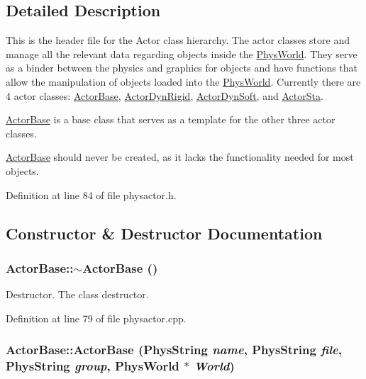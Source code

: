 \subsection{Detailed Description}
This is the header file for the Actor class hierarchy. The actor classes store and manage all the relevant data regarding objects inside the \hyperlink{classPhysWorld}{PhysWorld}. They serve as a binder between the physics and graphics for objects and have functions that allow the manipulation of objects loaded into the \hyperlink{classPhysWorld}{PhysWorld}. Currently there are 4 actor classes: \hyperlink{classActorBase}{ActorBase}, \hyperlink{classActorDynRigid}{ActorDynRigid}, \hyperlink{classActorDynSoft}{ActorDynSoft}, and \hyperlink{classActorSta}{ActorSta}. \par
 \hyperlink{classActorBase}{ActorBase} is a base class that serves as a template for the other three actor classes. \par
 \hyperlink{classActorBase}{ActorBase} should never be created, as it lacks the functionality needed for most objects. 

Definition at line 84 of file physactor.h.

\subsection{Constructor \& Destructor Documentation}
\hypertarget{classActorBase_a6fd984c46b3232c2522adb44be4dedb7}{
\subsubsection[{$\sim$ActorBase}]{\setlength{\rightskip}{0pt plus 5cm}ActorBase::$\sim$ActorBase ()}}
\label{dd/d7b/classActorBase_a6fd984c46b3232c2522adb44be4dedb7}


Destructor. The class destructor. 

Definition at line 79 of file physactor.cpp.\hypertarget{classActorBase_a673d963aa7a99475cb03250c010dfa15}{
\subsubsection[{ActorBase}]{\setlength{\rightskip}{0pt plus 5cm}ActorBase::ActorBase (PhysString {\em name}, \/  PhysString {\em file}, \/  PhysString {\em group}, \/  {\bf PhysWorld} $\ast$ {\em World})}}
\label{dd/d7b/classActorBase_a673d963aa7a99475cb03250c010dfa15}


